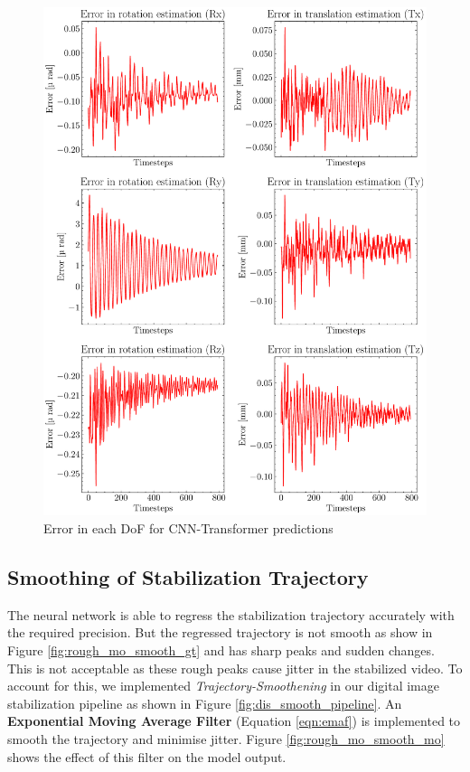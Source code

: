 \begin{figure}[H]
    \centering
    \includegraphics[scale=0.65]{images/fig_chapter4/nn_related/error_in_predicted_vs_ground_truth_transformer.pdf}
    \caption{Error in each DoF for CNN-Transformer predictions}
    \label{fig:cnn_trans_error}
\end{figure}

\subsection{Smoothing of Stabilization Trajectory}
The neural network is able to regress the stabilization trajectory accurately with the required precision. But the regressed trajectory is not smooth as show in Figure \ref{fig:rough_mo_smooth_gt} and has sharp peaks and sudden changes. This is not acceptable as these rough peaks cause jitter in the stabilized video. To account for this, we implemented \textit{Trajectory-Smoothening} in our digital image stabilization pipeline as shown in Figure \ref{fig:dis_smooth_pipeline}. An \textbf{Exponential Moving Average Filter} (Equation \ref{eqn:emaf}) is implemented to smooth the trajectory and minimise jitter. Figure \ref{fig:rough_mo_smooth_mo} shows the effect of this filter on the model output.

